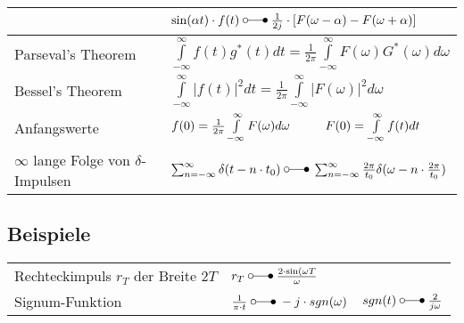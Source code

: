 \begin{tabular}{|p{9cm}|p{8cm}|}
 			& $\sin(\alpha t) \cdot f(t) \; \laplace \; \frac{1}{2j}\cdot \left[
 			F(\omega-\alpha) - F(\omega+\alpha)\right ]$\\
 			\hline
        	Parseval's Theorem &
 			$\int\limits_{-\infty}^{\infty}f(t)g^{\ast}(t)dt = \frac{1}{2\pi}
  			\int\limits_{-\infty}^{\infty}F(\omega)G^{\ast}(\omega)d\omega$\\
  			\hline
  			Bessel's Theorem &
  			$\int\limits_{-\infty}^{\infty}|f(t)|^2 dt = \frac{1}{2\pi}
  			\int\limits_{-\infty}^{\infty}|F(\omega)|^2 d\omega$\\
  			\hline 			
			Anfangswerte &
			$f(0)=\frac{1}{2\pi}\int\limits_{-\infty}^{\infty}F(\omega)d\omega
			\hspace*{1cm} F(0)=\int\limits_{-\infty}^{\infty}f(t)dt$\\
			\hline
			$\infty$ lange Folge von $\delta$-Impulsen &
			$\sum_{n=-\infty}^{\infty} \delta(t-n\cdot t_0) \; \laplace \;
			\sum_{n=-\infty}^{\infty} \frac{2\pi}{t_0}\delta(\omega-n\cdot
			\frac{2\pi}{t_0})$\\
			\hline
        \end{tabular}
        
\subsection{Beispiele}
\begin{tabular}{l l l}
Rechteckimpuls $r_T$ der Breite $2T$ & $r_T \; \laplace \; \frac{2 \cdot \sin(\omega T}{\omega}$ \\
Signum-Funktion & $\frac{1}{\pi \cdot t} \; \laplace \; -j \cdot sgn(\omega)$ 	& $sgn(t) \; \laplace \; \frac{2}{j\omega}$ \\
\end{tabular}


